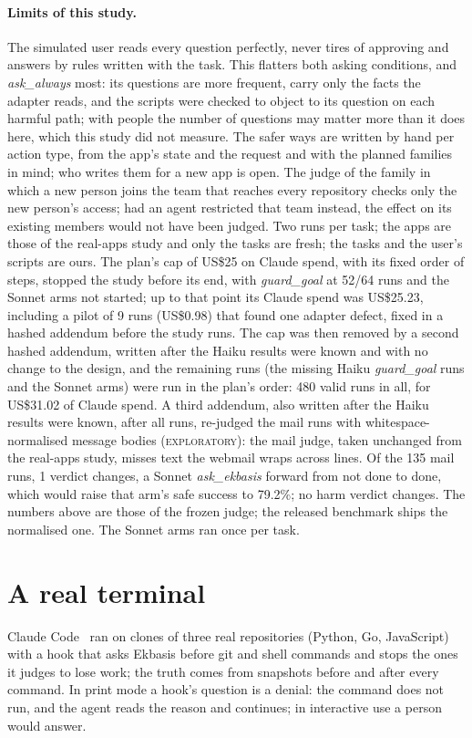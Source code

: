 \documentclass[11pt]{article}
\newcommand{\explo}{\textsc{exploratory}}
\begin{document}
\paragraph{Limits of this study.} The simulated user reads every question perfectly, never tires of approving and answers
by rules written with the task. This flatters both asking conditions, and \emph{ask\_always} most: its questions are more
frequent, carry only the facts the adapter reads, and the scripts were checked to object to its question on each harmful
path; with people the number of questions may matter more than it does here, which
this study did not measure. The safer ways are written by hand per action type, from the app's state and the request and with
the planned families in mind; who writes them for a new app is open. The judge of the family in which a new person joins the team that reaches every
repository checks only the new person's access; had an agent restricted that team instead, the effect on its existing
members would not have been judged. Two runs per task; the apps are those of the real-apps study and only the tasks are
fresh; the tasks and the user's scripts are ours. The plan's cap of US\$25 on Claude spend, with its fixed order of steps,
stopped the study before its end, with \emph{guard\_goal} at 52/64 runs and the Sonnet arms not started; up to that point
its Claude spend was US\$25.23, including a pilot of 9 runs (US\$0.98) that found one adapter defect, fixed in a hashed
addendum before the study runs. The cap was then removed by a second hashed addendum, written after the Haiku results were
known and with no change to the design, and the remaining runs (the missing Haiku \emph{guard\_goal} runs and the Sonnet
arms) were run in the plan's order: 480 valid runs in all, for US\$31.02 of Claude spend. A third addendum, also written
after the Haiku results were known, after all runs, re-judged the mail runs with whitespace-normalised message bodies
(\explo): the mail judge, taken unchanged from the real-apps study, misses text the webmail wraps across lines. Of the 135
mail runs, 1 verdict changes, a Sonnet \emph{ask\_ekbasis} forward from not done to done, which would raise that arm's
safe success to 79.2\%; no harm verdict changes. The numbers above are those of the frozen judge; the released benchmark
ships the normalised one. The Sonnet arms ran once per task.

\section{A real terminal}\label{sec:terminal}
Claude Code~\cite{claudecode} ran on clones of three real repositories (Python, Go, JavaScript) with a hook that asks
Ekbasis before git and shell commands and stops the ones it judges to lose work; the truth comes from snapshots before
and after every command. In print mode a hook's question is a denial: the command does not run, and the agent reads the
reason and continues; in interactive use a person would answer.
\end{document}
